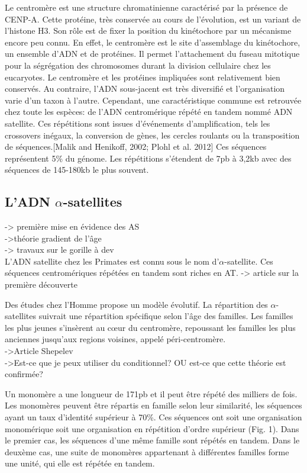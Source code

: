 \documentclass[12pt,a4paper]{article}
\begin{document}
Le centromère est une structure chromatinienne caractérisé par la présence de CENP-A. Cette protéine, très conservée au cours de l'évolution, est un variant de l'histone H3. Son rôle est de fixer la position du kinétochore par un mécanisme encore peu connu. En effet, le centromère est le site d'assemblage du kinétochore, un ensemble d'ADN et de protéines. Il permet l'attachement du fuseau mitotique pour la ségrégation des chromosomes durant la division cellulaire chez les eucaryotes. Le centromère et les protéines impliquées sont relativement bien conservés. Au contraire, l'ADN sous-jacent est très diversifié et l'organisation varie d'un taxon à l'autre. Cependant, une caractéristique commune est retrouvée chez toute les espèces: de l'ADN centromérique répété en tandem nommé ADN satellite. Ces répétitions sont issues d'événements d'amplification, tels les crossovers inégaux, la conversion de gènes, les cercles roulants ou la transposition de séquences.[Malik and Henikoff, 2002; Plohl et al. 2012]
Ces séquences représentent 5\% du génome. Les répétitions s'étendent de 7pb à 3,2kb avec des séquences de 145-180kb le plus souvent.  

\subsection{L'ADN $\alpha$-satellites}
-> première mise en évidence des AS\\
->théorie gradient de l'âge\\
-> travaux sur le gorille à dev\\

L'ADN satellite chez les Primates est connu sous le nom d'$\alpha$-satellite. Ces séquences centromériques répétées en tandem sont riches en AT. 
-> article sur la première découverte

Des études chez l'Homme propose un modèle évolutif. La répartition des $\alpha$-satellites suivrait une répartition spécifique selon l'âge des familles. Les familles les plus jeunes s'insèrent au cœur du centromère, repoussant les familles les plus anciennes jusqu'aux regions voisines, appelé péri-centromère.\\
->Article Shepelev\\
->Est-ce que je peux utiliser du conditionnel? OU est-ce que cette théorie est confirmée?

Un monomère a une longueur de 171pb et il peut être répété des milliers de fois. Les monomères peuvent être répartis en famille selon leur similarité, les séquences ayant un taux d'identité supérieur à 70\%. Ces séquences ont soit une organisation monomérique soit une organisation en répétition d'ordre supérieur (Fig. 1). Dans le premier cas, les séquences d'une même famille sont répétés en tandem. Dans le deuxème cas, une suite de monomères appartenant à différentes familles forme une unité, qui elle est répétée en tandem. 
\end{document}
